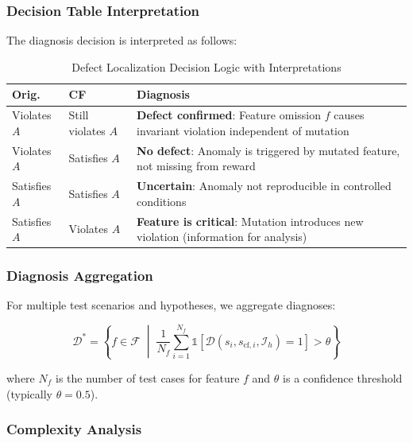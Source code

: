 \documentclass[conference]{IEEEtran}
\theoremstyle{plain}
\newcommand{\diag}{\mathcal{D}}
\begin{document}
\subsubsection{Decision Table Interpretation}

The diagnosis decision is interpreted as follows:

\begin{table}[h]
\centering
\caption{Defect Localization Decision Logic with Interpretations}
\label{tab:decision}
\begin{tabular}{llp{4.0cm}}
\toprule
\textbf{Orig.} & \textbf{CF} & \textbf{Diagnosis} \\
\midrule
\cellcolor{red!15}Violates $A$ & \cellcolor{red!15}Still violates $A$ & \cellcolor{red!15}\textbf{Defect confirmed}: Feature omission $f$ causes invariant violation independent of mutation \\
\cellcolor{green!15}Violates $A$ & \cellcolor{green!15}Satisfies $A$ & \cellcolor{green!15}\textbf{No defect}: Anomaly is triggered by mutated feature, not missing from reward \\
\cellcolor{orange!15}Satisfies $A$ & \cellcolor{orange!15}Satisfies $A$ & \cellcolor{orange!15}\textbf{Uncertain}: Anomaly not reproducible in controlled conditions \\
\cellcolor{yellow!15}Satisfies $A$ & \cellcolor{yellow!15}Violates $A$ & \cellcolor{yellow!15}\textbf{Feature is critical}: Mutation introduces new violation (information for analysis) \\
\bottomrule
\end{tabular}
\end{table}

\subsubsection{Diagnosis Aggregation}

For multiple test scenarios and hypotheses, we aggregate diagnoses:

\begin{equation}
\mathcal{D}^* = \left\{ f \in \mathcal{F} \;\middle|\; \frac{1}{N_f} \sum_{i=1}^{N_f} \mathbb{1}[\diag(s_i, s_{\text{cf},i}, \mathcal{I}_h) = 1] > \theta \right\}
\label{eq:aggregation}
\end{equation}

where $N_f$ is the number of test cases for feature $f$ and $\theta$ is a confidence threshold (typically $\theta = 0.5$).

\subsubsection{Complexity Analysis}
\end{document}
